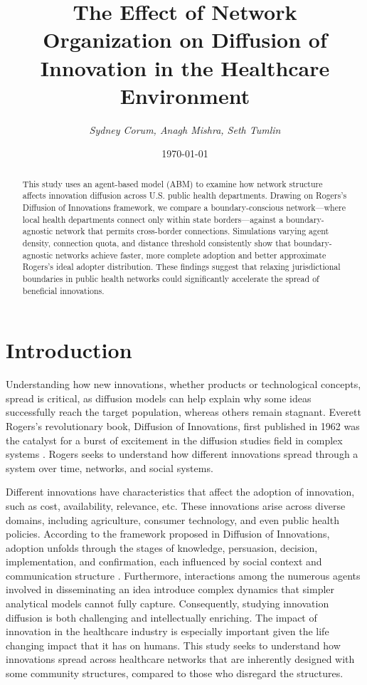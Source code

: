 \documentclass[12pt]{article}
\title{The Effect of Network Organization on Diffusion of Innovation in the Healthcare Environment}
\author{\textit{Sydney Corum, Anagh Mishra, Seth Tumlin}}
\date{\today}
\begin{document}
\maketitle
\begin{abstract}
    This study uses an agent-based model (ABM) to examine how network structure affects innovation diffusion across U.S. public health departments. Drawing on Rogers's Diffusion of Innovations framework, we compare a boundary-conscious network—where local health departments connect only within state borders—against a boundary-agnostic network that permits cross-border connections. Simulations varying agent density, connection quota, and distance threshold consistently show that boundary-agnostic networks achieve faster, more complete adoption and better approximate Rogers's ideal adopter distribution. These findings suggest that relaxing jurisdictional boundaries in public health networks could significantly accelerate the spread of beneficial innovations.
\end{abstract}

\section{Introduction}
\par 
Understanding how new innovations, whether products or technological concepts, spread is critical, as diffusion models can help explain why some ideas successfully reach the target population, whereas others remain stagnant. Everett Rogers’s revolutionary book, Diffusion of Innovations, first published in 1962 was the catalyst for a burst of excitement in the diffusion studies field in complex systems \cite{rogers_diffusion_1983}. Rogers seeks to understand how different innovations spread through a system over time, networks, and social systems. 
\par 
Different innovations have characteristics that affect the adoption of innovation, such as cost, availability, relevance, etc. These innovations arise across diverse domains, including agriculture, consumer technology, and even public health policies. According to the framework proposed in Diffusion of Innovations, adoption unfolds through the stages of knowledge, persuasion, decision, implementation, and confirmation, each influenced by social context and communication structure \cite{rogers_diffusion_1983} . Furthermore, interactions among the numerous agents involved in disseminating an idea introduce complex dynamics that simpler analytical models cannot fully capture. Consequently, studying innovation diffusion is both challenging and intellectually enriching. The impact of innovation in the healthcare industry is especially important given the life changing impact that it has on humans.
This study seeks to understand how innovations spread across healthcare networks that are inherently designed with some community structures, compared to those who disregard the structures. 
\end{document}
